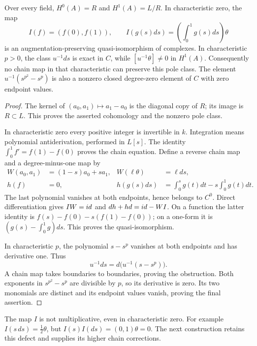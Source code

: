 \begin{proposition}
\label{sb:prop:coefficient-comparison}
Over every field,
\(H^0(A)=R\) and \(H^1(A)=L/R\).
In characteristic zero, the map
\[
 I(f)=(f(0),f(1)),\qquad
 I(g(s)ds)=\left(\int_0^1g(s)ds\right)\theta
\]
is an augmentation-preserving quasi-isomorphism of complexes.
In characteristic \(p>0\), the class \(u^{-1}ds\) is exact
in \(C\), while \([u^{-1}\theta]\ne0\) in \(H^1(A)\).
Consequently no chain map in that characteristic can preserve this pole class.
The element \(u^{-1}(s^{p^2}-s^p)\) is also a nonzero closed
degree-zero element of \(C\) with zero endpoint values.
\end{proposition}

\begin{proof}
The kernel of \((a_0,a_1)\mapsto a_1-a_0\) is the diagonal
copy of \(R\); its image is \(R\subset L\).  This proves
the asserted cohomology and the nonzero pole class.

In characteristic zero every positive integer is invertible in \(k\).
Integration means polynomial antiderivation, performed in \(L[s]\).
The identity \(\int_0^1 f'=f(1)-f(0)\) proves the chain equation.
Define a reverse chain map and a degree-minus-one map by
\[
 \begin{aligned}
 W(a_0,a_1)&=(1-s)a_0+sa_1,& W(\ell\theta)&=\ell ds,\\
 h(f)&=0,&
 h(g(s)ds)&=\int_0^s g(t)dt-s\int_0^1g(t)dt.
 \end{aligned}
\]
The last polynomial vanishes at both endpoints, hence belongs to
\(C^0\).  Direct differentiation gives
\(IW=id\) and \(dh+hd=id-WI\).
On a function the latter identity is
\(f(s)-f(0)-s(f(1)-f(0))\); on a one-form it is
\((g(s)-\int_0^1g)ds\).  This proves the quasi-isomorphism.

In characteristic \(p\), the polynomial \(s-s^p\) vanishes
at both endpoints and has derivative one.  Thus
\begin{equation}\label{sb:eq:exact-pole}
 u^{-1}ds=d\bigl(u^{-1}(s-s^p)\bigr).
\end{equation}
A chain map takes boundaries to boundaries, proving the obstruction.
Both exponents in \(s^{p^2}-s^p\) are divisible by \(p\), so
its derivative is zero.  Its two monomials are distinct and its
endpoint values vanish, proving the final assertion.
\end{proof}

The map \(I\) is not multiplicative, even in characteristic zero.
For example \(I(s\,ds)=\tfrac12\theta\), but
\(I(s)I(ds)=(0,1)\theta=0\).  The next construction retains
this defect and supplies its higher chain corrections.

